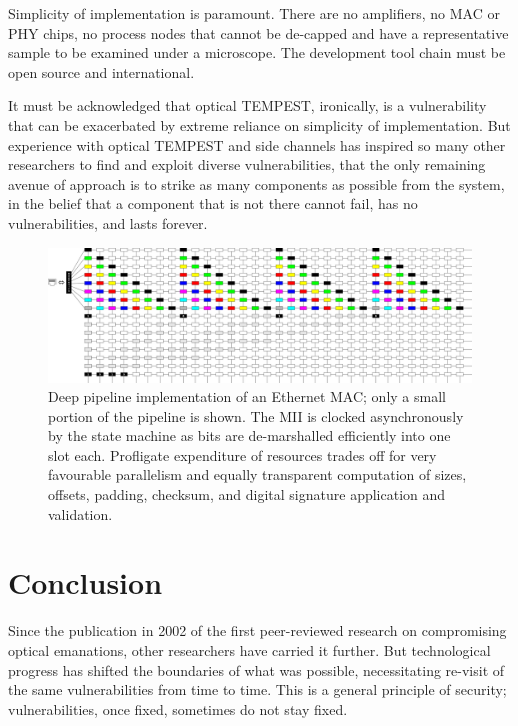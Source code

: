 \documentclass[conference]{IEEEtran}
\begin{document}
Simplicity of implementation is paramount. There are no amplifiers, no MAC
or PHY chips, no process nodes that cannot be de-capped and have a
representative sample to be examined under a microscope. The development tool
chain must be open source and international.

It must be acknowledged that optical TEMPEST, ironically, is a vulnerability
that can be exacerbated by extreme reliance on simplicity of implementation.
But experience with optical TEMPEST and side channels has inspired so many
other researchers to find and exploit diverse vulnerabilities, that the only
remaining avenue of approach is to strike as many components as possible from
the system, in the belief that a component that is not there cannot fail, has
no vulnerabilities, and lasts forever.

\begin{figure}[!t]
    \centering
	\includegraphics[width=\textwidth]{graphics/deep_pipeline.png}
	\caption{Deep pipeline implementation of an Ethernet MAC; only a small
        portion of the pipeline is shown. The MII is clocked asynchronously
        by the state machine as bits are de-marshalled efficiently into one
        slot each. Profligate expenditure of resources trades off for very
        favourable parallelism and equally transparent computation of sizes,
        offsets, padding, checksum, and digital signature application and
        validation.}
	\label{figure:deep_pipeline}
\end{figure}

\section{Conclusion}

Since the publication in 2002 of the first peer-reviewed research on
compromising optical emanations, other researchers have carried it further.
But technological progress has shifted the boundaries of what was possible,
necessitating re-visit of the same vulnerabilities from time to time. This is
a general principle of security; vulnerabilities, once fixed, sometimes do
not stay fixed.
\end{document}
